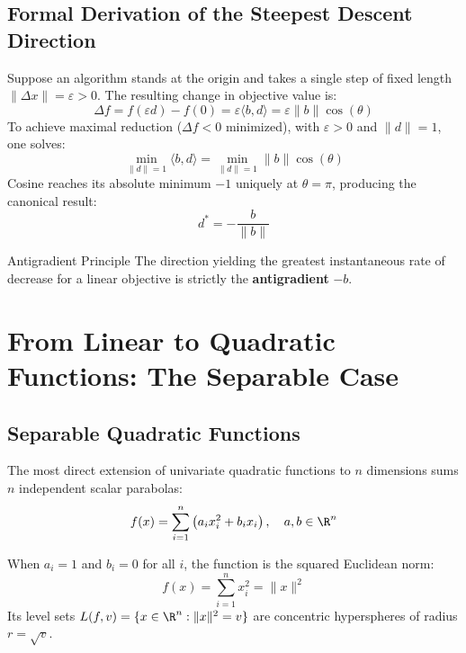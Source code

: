 \subsection{Formal Derivation of the Steepest Descent Direction}
Suppose an algorithm stands at the origin and takes a single step of fixed length $\|\Delta x\| = \varepsilon > 0$. The resulting change in objective value is:
\begin{equation}
\Delta f = f(\varepsilon d) - f(0) = \varepsilon \langle b, d \rangle = \varepsilon \|b\| \cos(\theta)
\end{equation}
To achieve maximal reduction ($\Delta f < 0$ minimized), with $\varepsilon > 0$ and $\|d\| = 1$, one solves:
\begin{equation}
\min_{\|d\| = 1} \langle b, d \rangle = \min_{\|d\|=1} \|b\| \cos(\theta)
\end{equation}
Cosine reaches its absolute minimum $-1$ uniquely at $\theta = \pi$, producing the canonical result:
\begin{equation}
d^* = -\frac{b}{\|b\|}
\end{equation}

\begin{noteblock}{Antigradient Principle}
The direction yielding the greatest instantaneous rate of decrease for a linear objective is strictly the \textbf{antigradient} $-b$.
\end{noteblock}


\FloatBarrier
\section{From Linear to Quadratic Functions: The Separable Case}
\label{sec:opt-separable-quadratic-en}

\subsection{Separable Quadratic Functions}
The most direct extension of univariate quadratic functions to $n$ dimensions sums $n$ independent scalar parabolas:
\begin{equation}
f(x) = \sum_{i=1}^n \left( a_i x_i^2 + b_i x_i \right), \quad a, b \in \R^n
\end{equation}

When $a_i = 1$ and $b_i = 0$ for all $i$, the function is the squared Euclidean norm:
\begin{equation}
f(x) = \sum_{i=1}^n x_i^2 = \|x\|^2
\end{equation}
Its level sets $L(f, v) = \{x \in \R^n : \|x\|^2 = v\}$ are concentric hyperspheres of radius $r = \sqrt{v}$.

